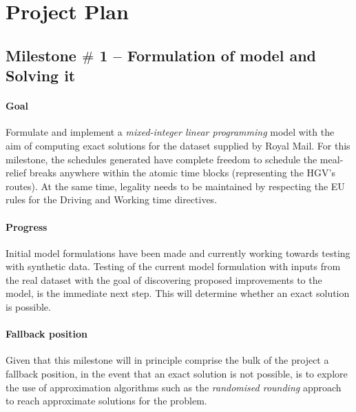 \chapter{Project Plan}


\section{Milestone $\#$ 1 – Formulation of model and Solving it}
\vspace{\baselineskip}
\subsubsection*{Goal}

Formulate and implement a \textit{mixed-integer linear programming} model with the aim of computing exact solutions for the dataset supplied by Royal Mail. For this milestone, the schedules generated  have complete freedom to schedule the meal-relief breaks anywhere within the atomic time blocks (representing the HGV's routes). At the same time, legality needs to be maintained by respecting the EU rules for the Driving and Working time directives. 



\vspace{\baselineskip}
\subsubsection*{Progress}

Initial model formulations have been made and currently working towards testing with synthetic data. Testing of the current model formulation with inputs from the real dataset with the goal of discovering proposed improvements to the model, is the immediate next step. This will  determine whether an exact solution is possible.



\vspace{\baselineskip}
\subsubsection*{Fallback position}

Given that this milestone will in principle comprise the bulk of the project a fallback position, in the event that an exact solution is not possible, is to explore the use of approximation algorithms such as the \textit{randomised rounding }approach to reach approximate solutions for the problem.




